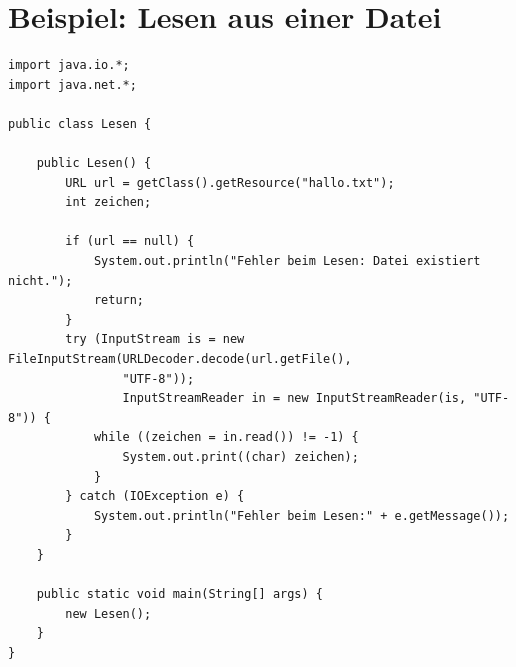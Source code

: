 \section{Beispiel: Lesen aus einer Datei}

\begin{lstlisting}
import java.io.*;
import java.net.*;

public class Lesen {
	
    public Lesen() {
        URL url = getClass().getResource("hallo.txt");
        int zeichen;
	
        if (url == null) {
            System.out.println("Fehler beim Lesen: Datei existiert nicht.");
            return;
        }
        try (InputStream is = new FileInputStream(URLDecoder.decode(url.getFile(), 
                "UTF-8"));
                InputStreamReader in = new InputStreamReader(is, "UTF-8")) {
            while ((zeichen = in.read()) != -1) {
                System.out.print((char) zeichen);
            }
        } catch (IOException e) {
            System.out.println("Fehler beim Lesen:" + e.getMessage());
        }
    }

    public static void main(String[] args) {
        new Lesen();
    }
}
\end{lstlisting}